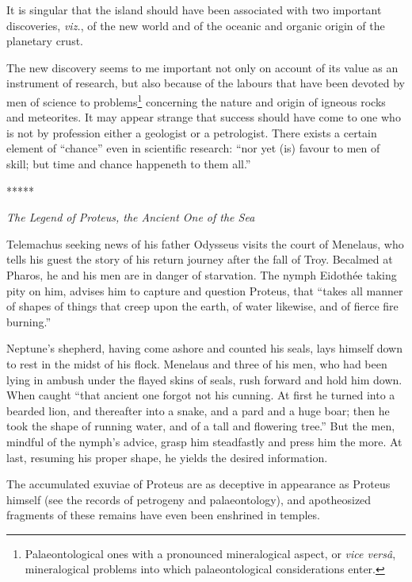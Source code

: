 \documentclass[a4paper, 12pt, oneside]{article}
\begin{document}
It is singular that the island should have been associated with two important discoveries, \emph{viz.}, of the new world and of the oceanic and organic origin of the planetary crust.

The new discovery seems to me important not only on account of its value as an instrument of research, but also because of the labours that have been devoted by men of science to problems\footnote{Palaeontological ones with a pronounced mineralogical aspect, or \emph{vice versâ}, mineralogical problems into which palaeontological considerations enter.} concerning the nature and origin of igneous rocks and meteorites. It may appear strange that success should have come to one who is not by profession either a geologist or a petrologist. There exists a certain element of ``chance'' even in scientific research: ``nor yet (is) favour to men of skill; but time and chance happeneth to them all.''

\centerline{*\hspace{15mm}*\hspace{15mm}*\hspace{15mm}*\hspace{15mm}*}
\bigskip

\centerline{\emph{The Legend of Proteus, the Ancient One of the Sea}}

Telemachus seeking news of his father Odysseus visits the court of Menelaus, who tells his guest the story of his return journey after the fall of Troy. Becalmed at Pharos, he and his men are in danger of starvation. The nymph Eidothée taking pity on him, advises him to capture and question Proteus, that ``takes all manner of shapes of things that creep upon the earth, of water likewise, and of fierce fire burning.''

Neptune's shepherd, having come ashore and counted his seals, lays himself down to rest in the midst of his flock. Menelaus and three of his men, who had been lying in ambush under the flayed skins of seals, rush forward and hold him down. When caught ``that ancient one forgot not his cunning. At first he turned into a bearded lion, and thereafter into a snake, and a pard and a huge boar; then he took the shape of running water, and of a tall and flowering tree.'' But the men, mindful of the nymph's advice, grasp him steadfastly and press him the more. At last, resuming his proper shape, he yields the desired information.

The accumulated exuviae of Proteus are as deceptive in appearance as Proteus himself (see the records of petrogeny and palaeontology), and apotheosized fragments of these remains have even been enshrined in temples.
\end{document}

